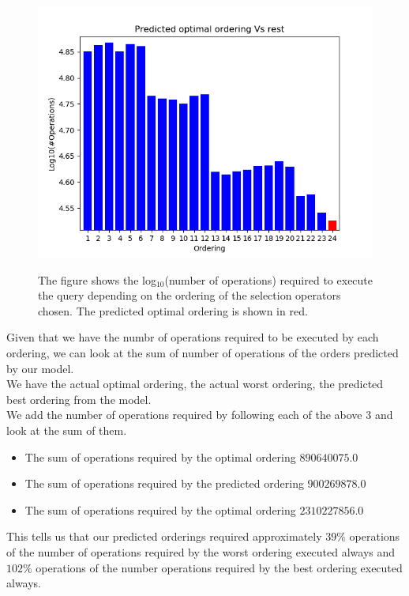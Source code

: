 \begin{figure}
\centering
\includegraphics[scale=0.8]{operations2.png}\\
\caption{The figure shows the log$_{10}$(number of operations) required to execute the query depending on the ordering of the selection operators chosen. The predicted optimal ordering is shown in red.}
\label{fig:operations2}
\end{figure}

\par Given that we have the numbr of operations required to be executed by each ordering, we can look at the sum of number of operations of the orders predicted by our model.\\ 
We have the actual optimal ordering, the actual worst ordering, the predicted best ordering from the model.\\
We add the number of operations required by following each of the above $3$ and look at the sum of them.
\begin{itemize}
    \item The sum of operations required by the optimal ordering $890640075.0$
    \item The sum of operations required by the predicted ordering $900269878.0$
    \item The sum of operations required by the optimal ordering $2310227856.0$
\end{itemize}
This tells us that our predicted orderings required approximately $39\%$ operations of the number of operations required by the worst ordering executed always and $102\%$ operations of the number operations required by the best ordering executed always.\\

